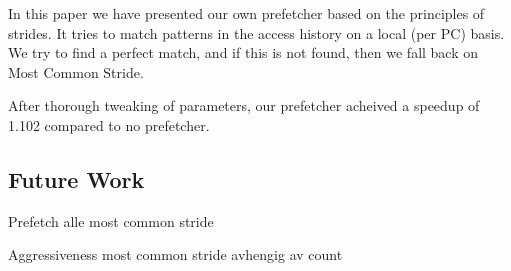 In this paper we have presented our own prefetcher based on the principles of strides. It tries to match patterns in the access history on a local (per PC) basis. We try to find a perfect match, and if this is not found, then we fall back on Most Common Stride.

After thorough tweaking of parameters, our prefetcher acheived a speedup of 1.102 compared to no prefetcher. 

\subsection{Future Work}

Prefetch alle most common stride

Aggressiveness most common stride avhengig av count

